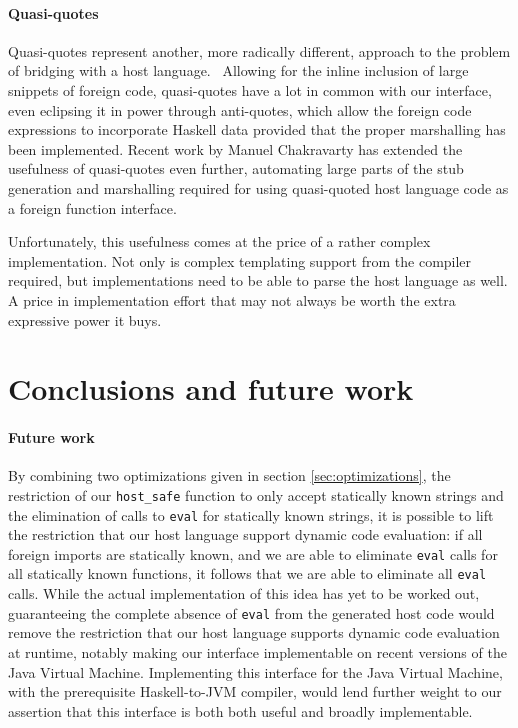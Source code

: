 \documentclass{sigplanconf}
\begin{document}
\paragraph{Quasi-quotes}
Quasi-quotes represent another, more radically different, approach to the
problem of bridging with a host language.\ \cite{quasiquotes}
Allowing for the inline inclusion of large snippets of foreign code,
quasi-quotes have a lot in common with our interface, even eclipsing it in
power through anti-quotes, which allow the foreign code expressions to
incorporate Haskell data provided that the proper marshalling has been
implemented. Recent work by Manuel Chakravarty has extended the usefulness of
quasi-quotes even further, automating large parts of the stub generation
and marshalling required for using quasi-quoted host language code as a
foreign function interface.\ \cite{language-c-inline}

Unfortunately, this usefulness comes at the price of a rather complex
implementation. Not only is complex templating support from the compiler
required, but implementations need to be able to parse the host language as
well. A price in implementation effort that may not always be worth the extra
expressive power it buys.

\section{Conclusions and future work}
\label{sec:conclusion}
\paragraph{Future work}
By combining two optimizations given in section \ref{sec:optimizations},
the restriction of our \lstinline!host_safe! function to only accept statically
known strings and the elimination of calls to \lstinline!eval! for statically
known strings, it is possible to lift the restriction that our host language
support dynamic code evaluation: if all foreign imports are statically known,
and we are able to eliminate \lstinline!eval! calls for all statically known
functions, it follows that we are able to eliminate all \lstinline!eval!
calls.
While the actual implementation of this idea has yet to be worked out,
guaranteeing the complete absence of \lstinline!eval! from the generated host
code would remove the restriction that our host language supports dynamic code
evaluation at runtime, notably making our interface implementable on
recent versions of the Java Virtual Machine.
Implementing this interface for the Java Virtual Machine, with the
prerequisite Haskell-to-JVM compiler, would lend further weight to our
assertion that this interface is both both useful and broadly implementable.
\end{document}
